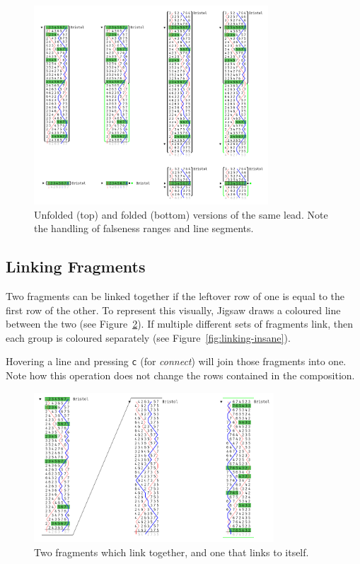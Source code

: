 \documentclass[12pt]{article}
\begin{document}
\begin{figure}
    \centering
    \includegraphics[width=0.78\textwidth]{folding-full}
    \caption{Unfolded (top) and folded (bottom) versions of the same lead.  Note the handling of
    falseness ranges and line segments.}\label{fig:lead-folding}
\end{figure}

\subsection{Linking Fragments}

Two fragments can be linked together if the leftover row of one is equal to the first row of the
other.  To represent this visually, Jigsaw draws a coloured line between the two (see
Figure~\ref{fig:linking}).  If multiple different sets of fragments link, then each group is
coloured separately (see Figure~\ref{fig:linking-insane}).

Hovering a line and pressing \verb|c| (for \emph{connect}) will join those fragments into one.  Note how
this operation does not change the rows contained in the composition.

\begin{figure}
    \centering
    \includegraphics[width=0.8\textwidth]{linking-2}
    \caption{Two fragments which link together, and one that links to itself.}\label{fig:linking}
\end{figure}
\end{document}
